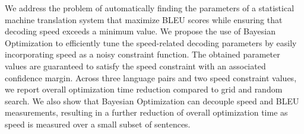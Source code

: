 We address the problem of automatically finding the parameters of a statistical machine translation system that maximize BLEU scores while ensuring that decoding speed exceeds a minimum value. We propose the use of Bayesian Optimization to efficiently tune the speed-related decoding parameters by easily incorporating speed as a noisy constraint function. The obtained parameter values are guaranteed to satisfy the speed constraint with an associated confidence margin. Across three language pairs and two speed constraint values, we report overall optimization time reduction compared to grid and random search. We also show that Bayesian Optimization can decouple speed and BLEU measurements, resulting in a further reduction of overall optimization time as speed is measured over a small subset of sentences.
